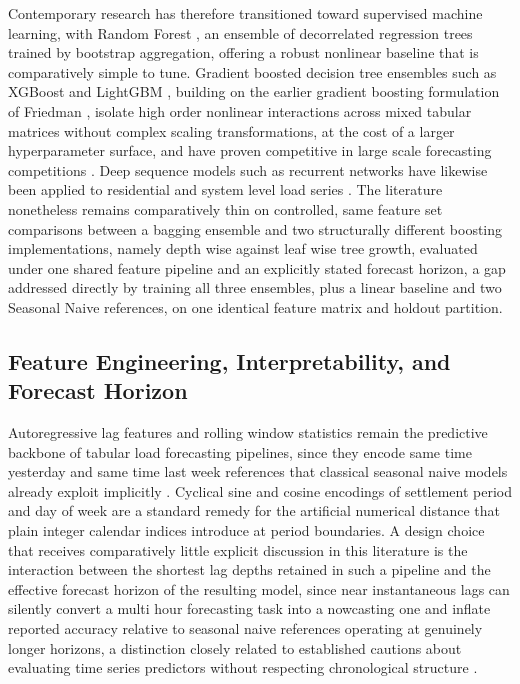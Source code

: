 \documentclass[runningheads]{llncs}
\begin{document}
Contemporary research has therefore transitioned toward supervised machine learning, with Random Forest \cite{breiman2001random}, an ensemble of decorrelated regression trees trained by bootstrap aggregation, offering a robust nonlinear baseline that is comparatively simple to tune. Gradient boosted decision tree ensembles such as XGBoost \cite{chen2016xgboost} and LightGBM \cite{ke2017lightgbm}, building on the earlier gradient boosting formulation of Friedman \cite{friedman2001greedy}, isolate high order nonlinear interactions across mixed tabular matrices without complex scaling transformations, at the cost of a larger hyperparameter surface, and have proven competitive in large scale forecasting competitions \cite{taieb2014gradient,hong2016gefcom}. Deep sequence models such as recurrent networks have likewise been applied to residential and system level load series \cite{kong2019short}. The literature nonetheless remains comparatively thin on controlled, same feature set comparisons between a bagging ensemble and two structurally different boosting implementations, namely depth wise against leaf wise tree growth, evaluated under one shared feature pipeline and an explicitly stated forecast horizon, a gap addressed directly by training all three ensembles, plus a linear baseline and two Seasonal Naive references, on one identical feature matrix and holdout partition.

\subsection{Feature Engineering, Interpretability, and Forecast Horizon}

Autoregressive lag features and rolling window statistics remain the predictive backbone of tabular load forecasting pipelines, since they encode same time yesterday and same time last week references that classical seasonal naive models already exploit implicitly \cite{deb2017review}. Cyclical sine and cosine encodings of settlement period and day of week are a standard remedy for the artificial numerical distance that plain integer calendar indices introduce at period boundaries. A design choice that receives comparatively little explicit discussion in this literature is the interaction between the shortest lag depths retained in such a pipeline and the effective forecast horizon of the resulting model, since near instantaneous lags can silently convert a multi hour forecasting task into a nowcasting one and inflate reported accuracy relative to seasonal naive references operating at genuinely longer horizons, a distinction closely related to established cautions about evaluating time series predictors without respecting chronological structure \cite{bergmeir2012use}.
\end{document}
